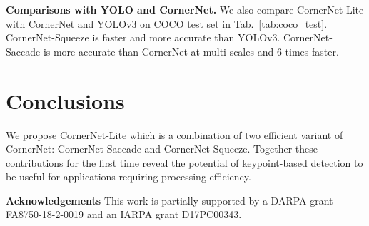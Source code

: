 \documentclass{bmvc2k}
\begin{document}
\begin{table}[h]
    \centering
    \caption{CornerNet-Lite versus CornerNet and YOLOv3 on COCO test set.}
    \label{tab:coco_test}
\end{table}

\smallskip \noindent \textbf{Comparisons with YOLO and CornerNet.} We also compare CornerNet-Lite with CornerNet and YOLOv3 on COCO test set in Tab.~\ref{tab:coco_test}. CornerNet-Squeeze is faster and more accurate than YOLOv3. CornerNet-Saccade is more accurate than CornerNet at multi-scales and 6 times faster.

\section{Conclusions}
We propose CornerNet-Lite which is a combination of two efficient variant of CornerNet: CornerNet-Saccade and CornerNet-Squeeze. Together these contributions for the first time reveal the potential of keypoint-based detection to be useful for applications requiring processing efficiency.

\smallskip \noindent \textbf{Acknowledgements} This work is partially supported by a DARPA grant FA8750-18-2-0019 and an IARPA grant D17PC00343.


\end{document}
